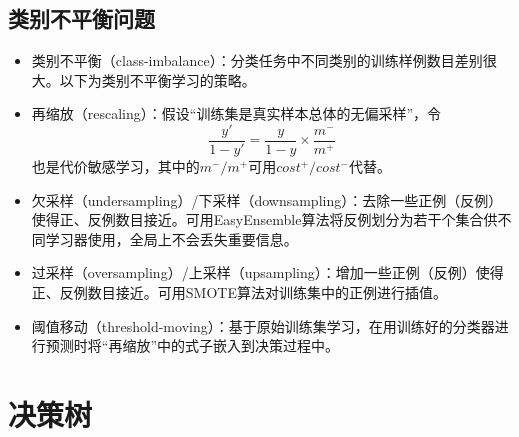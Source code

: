 \documentclass{ctexart}
\begin{document}
				\subsection{类别不平衡问题}
					\begin{itemize}
						\item 类别不平衡（class-imbalance）：分类任务中不同类别的训练样例数目差别很大。以下为类别不平衡学习的策略。
						\item 再缩放（rescaling）：假设``训练集是真实样本总体的无偏采样''，令\[\frac{y'}{1-y'}=\frac{y}{1-y}\times\frac{m^-}{m^+}\]也是代价敏感学习，其中的$m^-/m^+$可用$cost^+/cost^-$代替。
						\item 欠采样（undersampling）/下采样（downsampling）：去除一些正例（反例）使得正、反例数目接近。可用EasyEnsemble算法将反例划分为若干个集合供不同学习器使用，全局上不会丢失重要信息。
						\item 过采样（oversampling）/上采样（upsampling）：增加一些正例（反例）使得正、反例数目接近。可用SMOTE算法对训练集中的正例进行插值。
						\item 阈值移动（threshold-moving）：基于原始训练集学习，在用训练好的分类器进行预测时将``再缩放''中的式子嵌入到决策过程中。
					\end{itemize}
			\section{决策树}
\end{document}
